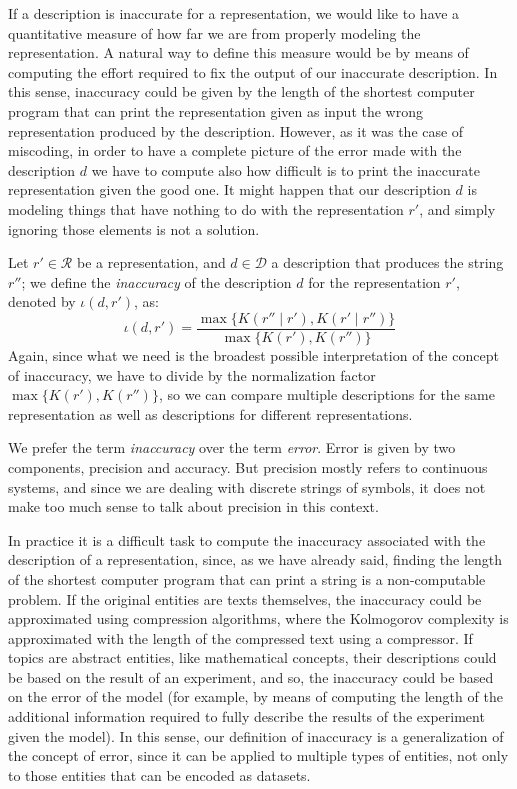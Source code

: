If a description is inaccurate for a representation, we would like to have a quantitative measure of how far we are from properly modeling the representation. A natural way to define this measure would be by means of computing the effort required to fix the output of our inaccurate description. In this sense, inaccuracy could be given by the length of the shortest computer program that can print the representation given as input the wrong representation produced by the description. However, as it was the case of miscoding, in order to have a complete picture of the error made with the description $d$ we have to compute also how difficult is to print the inaccurate representation given the good one. It might happen that our description $d$ is modeling things that have nothing to do with the representation $r'$, and simply ignoring those elements is not a solution.

Let $r' \in \mathcal{R}$ be a representation, and $d \in \mathcal{D}$ a description that produces the string $r''$; we define the \emph{inaccuracy} of the description $d$ for the representation $r'$, denoted by $\iota(d, r')$, as:
\[
\iota(d, r') = \frac{ \max\{ K(r'' \mid r'), K(r' \mid r'') \} } { \max\{ K(r'), K(r'') \} }
\]
Again, since what we need is the broadest possible interpretation of the concept of inaccuracy, we have to divide by the normalization factor $\max\{ K(r'), K(r'') \}$, so we can compare multiple descriptions for the same representation as well as descriptions for different representations.

We prefer the term \emph{inaccuracy} over the term \emph{error}. Error is given by two components, precision and accuracy. But precision mostly refers to continuous systems, and since we are dealing with discrete strings of symbols, it does not make too much sense to talk about precision in this context.

In practice it is a difficult task to compute the inaccuracy associated with the description of a representation, since, as we have already said, finding the length of the shortest computer program that can print a string is a non-computable problem. If the original entities are texts themselves, the inaccuracy could be approximated using compression algorithms, where the Kolmogorov complexity is approximated with the length of the compressed text using a compressor. If topics are abstract entities, like mathematical concepts, their descriptions could be based on the result of an experiment, and so, the inaccuracy could be based on the error of the model (for example, by means of computing the length of the additional information required to fully describe the results of the experiment given the model). In this sense, our definition of inaccuracy is a generalization of the concept of error, since it can be applied to multiple types of entities, not only to those entities that can be encoded as datasets.

